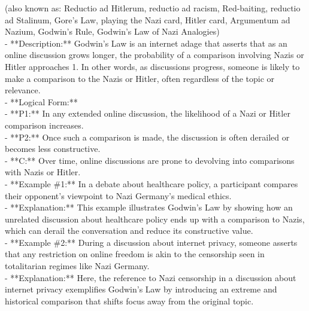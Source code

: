 \documentclass[a4paper,12pt,single,pdftex]{scrbook}
\begin{document}
      (also known as: Reductio ad Hitlerum, reductio ad racism, Red-baiting, reductio ad Stalinum, Gore's Law, playing the Nazi card, Hitler card, Argumentum ad Nazium, Godwin's Rule, Godwin's Law of Nazi Analogies)
    \\

  
    
      - **Description:** Godwin's Law is an internet adage that asserts that as an online discussion grows longer, the probability of a comparison involving Nazis or Hitler approaches 1. In other words, as discussions progress, someone is likely to make a comparison to the Nazis or Hitler, often regardless of the topic or relevance.
    \\

    
      - **Logical Form:**
    \\

    
        - **P1:** In any extended online discussion, the likelihood of a Nazi or Hitler comparison increases.
    \\

    
        - **P2:** Once such a comparison is made, the discussion is often derailed or becomes less constructive.
    \\

    
        - **C:** Over time, online discussions are prone to devolving into comparisons with Nazis or Hitler.
    \\

    
      - **Example \#1:** In a debate about healthcare policy, a participant compares their opponent's viewpoint to Nazi Germany's medical ethics.
    \\

    
      - **Explanation:** This example illustrates Godwin's Law by showing how an unrelated discussion about healthcare policy ends up with a comparison to Nazis, which can derail the conversation and reduce its constructive value.
    \\

    
      - **Example \#2:** During a discussion about internet privacy, someone asserts that any restriction on online freedom is akin to the censorship seen in totalitarian regimes like Nazi Germany.
    \\

    
      - **Explanation:** Here, the reference to Nazi censorship in a discussion about internet privacy exemplifies Godwin's Law by introducing an extreme and historical comparison that shifts focus away from the original topic.
    \\
\end{document}
